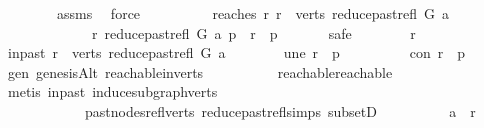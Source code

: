 \begin{isabellebody}
\ \ \ \ \ \ \ \ assms\ \isamarkupfalse%
\ force\ \ \ \ \isanewline
\ \ \ \ \isamarkupfalse%
\ reaches{\isacharcolon}{\kern0pt}\ {\isachardoublequoteopen}{\isacharparenleft}{\kern0pt}{\isasymforall}r{\isachardot}{\kern0pt}\ r\ {\isasymin}\ verts\ {\isacharparenleft}{\kern0pt}reduce{\isacharunderscore}{\kern0pt}past{\isacharunderscore}{\kern0pt}refl\ G\ a{\isacharparenright}{\kern0pt}\ {\isasymlongrightarrow}\isanewline
\ \ \ \ \ \ \ \ \ \ \ \ \ {\isacharparenleft}{\kern0pt}r\ {\isasymrightarrow}\isactrlsup {\isacharplus}{\kern0pt}\isactrlbsub reduce{\isacharunderscore}{\kern0pt}past{\isacharunderscore}{\kern0pt}refl\ G\ a\isactrlesub \ p\ {\isasymor}\ r\ {\isacharequal}{\kern0pt}\ p{\isacharparenright}{\kern0pt}{\isacharparenright}{\kern0pt}{\isachardoublequoteclose}\ \isanewline
\ \ \ \ \isamarkupfalse%
\ safe\isanewline
\ \ \ \ \ \ \isamarkupfalse%
\ r\isanewline
\ \ \ \ \ \ \isamarkupfalse%
\ in{\isacharunderscore}{\kern0pt}past{\isacharcolon}{\kern0pt}\ {\isachardoublequoteopen}r\ {\isasymin}\ verts\ {\isacharparenleft}{\kern0pt}reduce{\isacharunderscore}{\kern0pt}past{\isacharunderscore}{\kern0pt}refl\ G\ a{\isacharparenright}{\kern0pt}{\isachardoublequoteclose}\isanewline
\ \ \ \ \ \ \isamarkupfalse%
\ une{\isacharcolon}{\kern0pt}\ {\isachardoublequoteopen}r\ {\isasymnoteq}\ p{\isachardoublequoteclose}\isanewline
\ \ \ \ \ \ \isamarkupfalse%
\ \isamarkupfalse%
\ con{\isacharcolon}{\kern0pt}\ {\isachardoublequoteopen}r\ {\isasymrightarrow}\isactrlsup {\isacharasterisk}{\kern0pt}\ p{\isachardoublequoteclose}\ \isamarkupfalse%
\ gen\ genesisAlt\ reachable{\isacharunderscore}{\kern0pt}in{\isacharunderscore}{\kern0pt}verts\isanewline
\ \ \ \ \ \ \ \ \ \ reachable{}{\isacharunderscore}{\kern0pt}reachable\isanewline
\ \ \ \ \ \ \ \ \isamarkupfalse%
\ {\isacharparenleft}{\kern0pt}metis\ in{\isacharunderscore}{\kern0pt}past\ induce{\isacharunderscore}{\kern0pt}subgraph{\isacharunderscore}{\kern0pt}verts\isanewline
\ \ \ \ \ \ \ \ \ \ \ \ past{\isacharunderscore}{\kern0pt}nodes{\isacharunderscore}{\kern0pt}refl{\isacharunderscore}{\kern0pt}verts\ reduce{\isacharunderscore}{\kern0pt}past{\isacharunderscore}{\kern0pt}refl{\isachardot}{\kern0pt}simps\ subsetD{\isacharparenright}{\kern0pt}\ \ \isanewline
\ \ \ \ \ \ \isamarkupfalse%
\ {\isachardoublequoteopen}a\ {\isasymrightarrow}\isactrlsup {\isacharasterisk}{\kern0pt}\ r{\isachardoublequoteclose}\ \isamarkupfalse%

\end{isabellebody}

